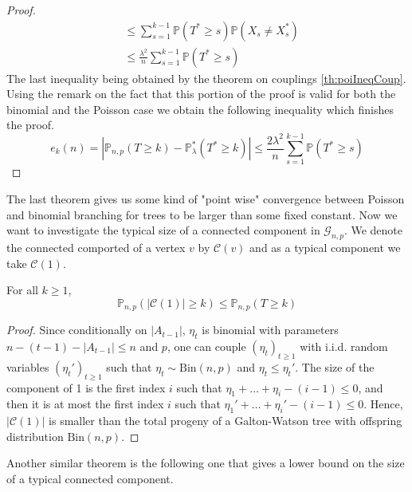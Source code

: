 \begin{proof}
\begin{align}
					&\leq  \sum_{s=1}^{k-1} \mathbb{P}(T^* \geq s)\mathbb{P}(X_s \neq X_s^*) 	\\
					     &\leq  \frac{\lambda ^2}{n} \sum_{s=1}^{k-1} \mathbb{P}(T^* \geq s) 
	\end{align}
	The last inequality being obtained by the theorem on couplings \ref{th:poiIneqCoup}.
	Using the remark on the fact that this portion of the proof is valid for both the binomial and the Poisson case we obtain the following inequality which finishes the proof.
	\begin{equation}
		e_k(n) = |\mathbb{P}_{n, p}(T \geq k) -\mathbb{P}_{\lambda}^*(T^* \geq k)| \leq \frac{2\lambda ^2}{n}\sum_{s=1}^{k-1} \mathbb{P}(T^* \geq s)
	\end{equation}
\end{proof}
The last theorem gives us some kind of "point wise" convergence between Poisson and binomial branching for trees to be larger than some fixed constant.
\newline
Now we want to investigate the typical size of a connected component in $\mathcal{G}_{n,p}$. We denote the connected comported of a vertex $v$ by $\mathcal{C}(v)$ and as a typical component we take $\mathcal{C}(1)$.
\begin{theorem}
	For all $k\geq1$,
	\begin{equation}
		\mathbb{P}_{n,p}(|\mathcal{C}(1)| \geq k) \leq \mathbb{P}_{n,p}(T\geq k)
	\end{equation}
\end{theorem}
\begin{proof}
	Since conditionally on $|A_{t-1}|$, $\eta_t$ is binomial with parameters $n - (t-1) -|A_{t-1}| \leq n$ and $p$, 
	one can couple $(\eta_t)_{t \geq 1}$ with i.i.d. random variables $(\eta_t')_{t\geq 1}$ such that $\eta_t \sim \text{Bin}(n,p)$ and $\eta_t \leq \eta_t'$.
	\newline
	The size of the component of 1 is the first index $i$ such that $\eta_1 + \ldots + \eta_i - (i-1) \leq 0$, 
	and then it is at most the first index $i$ such that $\eta_1' + \ldots + \eta_i' - (i-1) \leq 0$.
	Hence, $|\mathcal{C}(1)|$ is smaller than the total progeny of a Galton-Watson tree with offspring distribution $\text{Bin}(n,p)$.
	\end{proof}
Another similar theorem is the following one that gives a lower bound on the size of a typical connected component.

